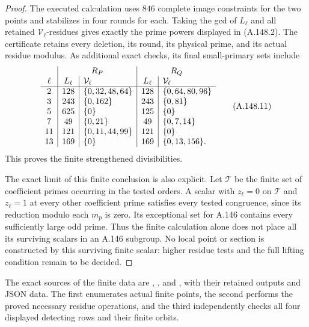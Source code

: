 \begin{proof}
The executed calculation uses \(846\) complete image constraints
for the two points and stabilizes in four rounds for each.
Taking the gcd of \(L_\ell\) and all retained
\(\mathcal V_\ell\)-residues gives exactly the prime powers
displayed in (A.148.2).  The certificate retains every deletion,
its round, its physical prime, and its actual residue modulus.
As additional exact checks, its final small-primary sets include
\[
 \begin{array}{c|c|l|c|l}
 &\multicolumn{2}{c|}{R_P}&\multicolumn{2}{c}{R_Q}\\
 \ell&L_\ell&\mathcal V_\ell&L_\ell&\mathcal V_\ell\\ \hline
 2&128&\{0,32,48,64\}&128&\{0,64,80,96\}\\
 3&243&\{0,162\}&243&\{0,81\}\\
 5&625&\{0\}&125&\{0\}\\
 7&49&\{0,21\}&49&\{0,7,14\}\\
 11&121&\{0,11,44,99\}&121&\{0\}\\
 13&169&\{0\}&169&\{0,13,156\}.
 \end{array}
\tag{A.148.11}
\]
This proves the finite strengthened divisibilities.

The exact limit of this finite conclusion is also explicit.
Let \(\mathcal T\) be the finite set of coefficient primes
occurring in the tested orders.  A scalar with
\(z_\ell=0\) on \(\mathcal T\) and \(z_\ell=1\)
at every other coefficient prime satisfies every tested
congruence, since its reduction modulo each \(m_p\) is zero.
Its exceptional set for A.146 contains every sufficiently
large odd prime.  Thus the finite calculation alone does not
place all its surviving scalars in an A.146 subgroup.
No local point or section is constructed by this surviving
finite scalar: higher residue tests and the full lifting
condition remain to be decided.
\end{proof}

The exact sources of the finite data are
,
, and
, with
their retained outputs and JSON data.  The first enumerates
actual finite points, the second performs the proved necessary
residue operations, and the third independently checks all
four displayed detecting rows and their finite orbits.
